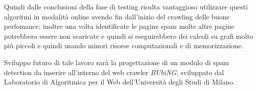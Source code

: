 Quindi dalle conclusioni della fase di testing risulta vantaggioso utilizzare questi algoritmi in modalità online avendo fin dall'inizio del crawling delle buone perfomance; inoltre una volta identificate le pagine spam molte altre pagine potrebbero essere non scaricate e quindi si eseguirebbero dei calcoli su grafi molto più piccoli e quindi usando minori risorse computazionali e di memorizzazione.

Sviluppo futuro di tale lavoro sarà la progettazione di un modulo di spam detection da inserire all'interno del  web crawler \textit{BUbiNG}, sviluppato dal Laboratorio di Algoritmica per il Web dell'Università degli Studi di Milano.


